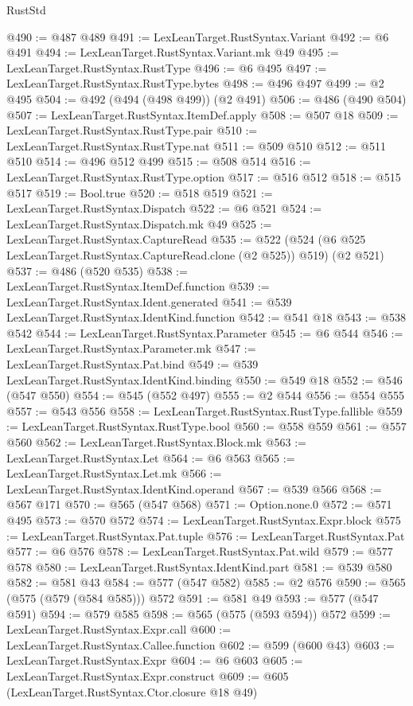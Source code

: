 \begin{lexlean}{RustStd}
\begin{coremodule}
@490 := @487 @489
@491 := LexLeanTarget.RustSyntax.Variant
@492 := @6 @491
@494 := LexLeanTarget.RustSyntax.Variant.mk @49
@495 := LexLeanTarget.RustSyntax.RustType
@496 := @6 @495
@497 := LexLeanTarget.RustSyntax.RustType.bytes
@498 := @496 @497
@499 := @2 @495
@504 := @492 (@494 (@498 @499)) (@2 @491)
@506 := @486 (@490 @504)
@507 := LexLeanTarget.RustSyntax.ItemDef.apply
@508 := @507 @18
@509 := LexLeanTarget.RustSyntax.RustType.pair
@510 := LexLeanTarget.RustSyntax.RustType.nat
@511 := @509 @510
@512 := @511 @510
@514 := @496 @512 @499
@515 := @508 @514
@516 := LexLeanTarget.RustSyntax.RustType.option
@517 := @516 @512
@518 := @515 @517
@519 := Bool.true
@520 := @518 @519
@521 := LexLeanTarget.RustSyntax.Dispatch
@522 := @6 @521
@524 := LexLeanTarget.RustSyntax.Dispatch.mk @49
@525 := LexLeanTarget.RustSyntax.CaptureRead
@535 := @522 (@524 (@6 @525 LexLeanTarget.RustSyntax.CaptureRead.clone (@2 @525)) @519) (@2 @521)
@537 := @486 (@520 @535)
@538 := LexLeanTarget.RustSyntax.ItemDef.function
@539 := LexLeanTarget.RustSyntax.Ident.generated
@541 := @539 LexLeanTarget.RustSyntax.IdentKind.function
@542 := @541 @18
@543 := @538 @542
@544 := LexLeanTarget.RustSyntax.Parameter
@545 := @6 @544
@546 := LexLeanTarget.RustSyntax.Parameter.mk
@547 := LexLeanTarget.RustSyntax.Pat.bind
@549 := @539 LexLeanTarget.RustSyntax.IdentKind.binding
@550 := @549 @18
@552 := @546 (@547 @550)
@554 := @545 (@552 @497)
@555 := @2 @544
@556 := @554 @555
@557 := @543 @556
@558 := LexLeanTarget.RustSyntax.RustType.fallible
@559 := LexLeanTarget.RustSyntax.RustType.bool
@560 := @558 @559
@561 := @557 @560
@562 := LexLeanTarget.RustSyntax.Block.mk
@563 := LexLeanTarget.RustSyntax.Let
@564 := @6 @563
@565 := LexLeanTarget.RustSyntax.Let.mk
@566 := LexLeanTarget.RustSyntax.IdentKind.operand
@567 := @539 @566
@568 := @567 @171
@570 := @565 (@547 @568)
@571 := Option.none.{0}
@572 := @571 @495
@573 := @570 @572
@574 := LexLeanTarget.RustSyntax.Expr.block
@575 := LexLeanTarget.RustSyntax.Pat.tuple
@576 := LexLeanTarget.RustSyntax.Pat
@577 := @6 @576
@578 := LexLeanTarget.RustSyntax.Pat.wild
@579 := @577 @578
@580 := LexLeanTarget.RustSyntax.IdentKind.part
@581 := @539 @580
@582 := @581 @43
@584 := @577 (@547 @582)
@585 := @2 @576
@590 := @565 (@575 (@579 (@584 @585))) @572
@591 := @581 @49
@593 := @577 (@547 @591)
@594 := @579 @585
@598 := @565 (@575 (@593 @594)) @572
@599 := LexLeanTarget.RustSyntax.Expr.call
@600 := LexLeanTarget.RustSyntax.Callee.function
@602 := @599 (@600 @43)
@603 := LexLeanTarget.RustSyntax.Expr
@604 := @6 @603
@605 := LexLeanTarget.RustSyntax.Expr.construct
@609 := @605 (LexLeanTarget.RustSyntax.Ctor.closure @18 @49)

\end{coremodule}
\end{lexlean}
